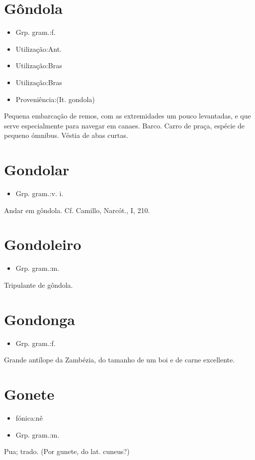 \section{Gôndola}
\begin{itemize}
\item {Grp. gram.:f.}
\end{itemize}
\begin{itemize}
\item {Utilização:Ant.}
\end{itemize}
\begin{itemize}
\item {Utilização:Bras}
\end{itemize}
\begin{itemize}
\item {Utilização:Bras}
\end{itemize}
\begin{itemize}
\item {Proveniência:(It. \textunderscore gondola\textunderscore )}
\end{itemize}
Pequena embarcação de remos, com as extremidades um pouco levantadas, e que serve especialmente para navegar em canaes.
Barco.
Carro de praça, espécie de pequeno ómnibus.
Véstia de abas curtas.
\section{Gondolar}
\begin{itemize}
\item {Grp. gram.:v. i.}
\end{itemize}
Andar em gôndola. Cf. Camillo, \textunderscore Narcót.\textunderscore , I, 210.
\section{Gondoleiro}
\begin{itemize}
\item {Grp. gram.:m.}
\end{itemize}
Tripulante de gôndola.
\section{Gondonga}
\begin{itemize}
\item {Grp. gram.:f.}
\end{itemize}
Grande antílope da Zambézia, do tamanho de um boi e de carne excellente.
\section{Gonete}
\begin{itemize}
\item {fónica:nê}
\end{itemize}
\begin{itemize}
\item {Grp. gram.:m.}
\end{itemize}
Pua; trado.
(Por \textunderscore gunete\textunderscore , do lat. \textunderscore cuneus\textunderscore ?)
